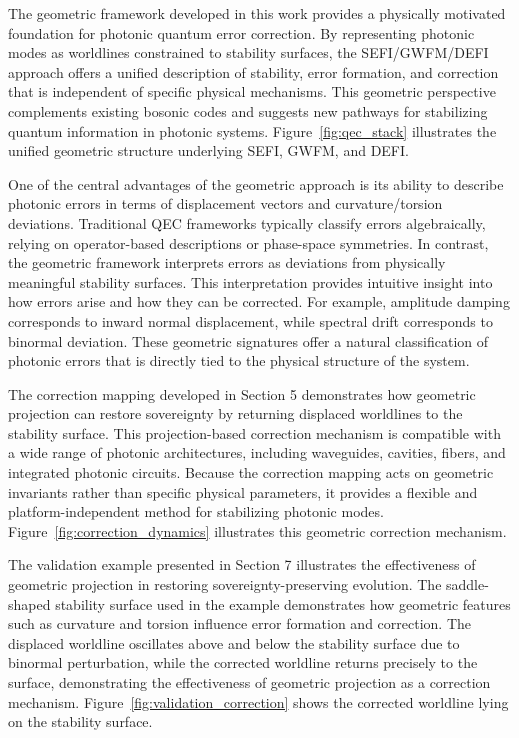 \documentclass[aip,adv,reprint,floatfix]{revtex4-2}
\begin{document}
The geometric framework developed in this work provides a physically motivated foundation for photonic
quantum error correction.\cite{DuttonSEFI2026,DuttonElectronField2026}
By representing photonic
modes as worldlines constrained to stability surfaces, the
SEFI/GWFM/DEFI approach offers a unified description of stability, error formation, and correction that is
independent of specific physical mechanisms. This geometric perspective complements existing bosonic codes
and suggests new pathways for stabilizing quantum information in photonic systems. Figure~\ref{fig:qec_stack}
illustrates the unified geometric structure underlying SEFI, GWFM, and DEFI.

One of the central advantages of the geometric approach is its ability to describe photonic errors in terms
of displacement vectors and curvature/torsion deviations.\cite{DuttonElectronField2026}
Traditional QEC frameworks typically classify errors algebraically, relying on operator-based descriptions
or phase-space symmetries. In contrast, the geometric
framework interprets errors as deviations from physically
meaningful stability surfaces. This interpretation provides intuitive insight into how errors arise and how they
can be corrected. For example, amplitude damping corresponds to inward normal displacement, while spectral
drift corresponds to binormal deviation. These geometric
signatures offer a natural classification of photonic errors
that is directly tied to the physical structure of the system.

The correction mapping developed in Section 5 demonstrates how geometric projection can restore sovereignty
by returning displaced worldlines to the stability surface.\cite{DuttonSEFI2026}
This projection-based correction mechanism is compatible with a wide range of photonic architectures, including waveguides, cavities, fibers, and integrated photonic
circuits. Because the correction mapping acts on geometric invariants rather than specific physical parameters, it
provides a flexible and platform-independent method for
stabilizing photonic modes. Figure~\ref{fig:correction_dynamics} illustrates this geometric correction mechanism.

The validation example presented in Section 7 illustrates the effectiveness of geometric projection in restoring sovereignty-preserving evolution.\cite{DuttonElectronField2026}
The saddle-shaped
stability surface used in the example demonstrates how
geometric features such as curvature and torsion influence error formation and correction. The displaced worldline oscillates above and below the stability surface due
to binormal perturbation, while the corrected worldline
returns precisely to the surface, demonstrating the effectiveness of geometric projection as a correction mechanism. Figure~\ref{fig:validation_correction} shows the corrected worldline
lying on the stability surface.
\end{document}

